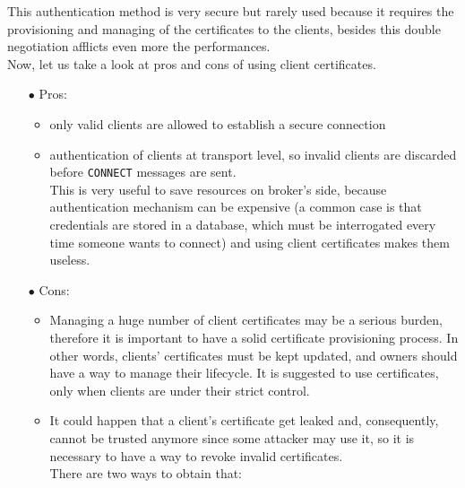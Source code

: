 \documentclass[12pt]{report}
\begin{document}
{This authentication method is very secure but rarely used because it requires the provisioning and managing of the certificates to the clients, besides this double negotiation afflicts even more the performances.\\

Now, let us take a look at pros and cons of using client certificates.
\begin{itemize}
\setlength{\itemindent}{+4mm}
\item[$\bullet$] Pros:
\begin{itemize}
\item only valid clients are allowed to establish a secure connection
\item authentication of clients at transport level, so invalid clients are discarded before \texttt{CONNECT} messages are sent.\\ 
This is very useful to save resources on broker's side, because authentication mechanism can be expensive (a common case is that credentials are stored in a database, which must be interrogated every time someone wants to connect) and using client certificates makes them useless.
\end{itemize}

\item[$\bullet$] Cons:
\begin{itemize}
\item Managing a huge number of client certificates may be a serious burden, therefore it is important to have a solid certificate provisioning process. In other words, clients' certificates must be kept updated, and owners should have a way to manage their lifecycle.
It is suggested to use certificates, only when clients are under their strict control.
\item It could happen that a client's certificate get leaked and, consequently, cannot be trusted anymore since some attacker may use it, so it is necessary to have a way to revoke invalid certificates.\\
There are two ways to obtain that:


\end{itemize}
\end{itemize}}
\end{document}
